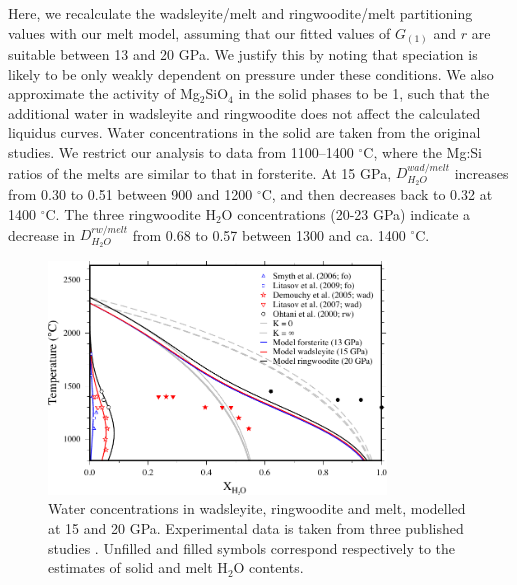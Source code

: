 \documentclass[review]{elsarticle}
\begin{document}
Here, we recalculate the wadsleyite/melt and ringwoodite/melt partitioning values with our melt model, assuming that our fitted values of $G_{(1)}$ and $r$ are suitable between 13 and 20 GPa. We justify this by noting that speciation is likely to be only weakly dependent on pressure under these conditions. We also approximate the activity of Mg$_2$SiO$_4$ in the solid phases to be 1, such that the additional water in wadsleyite and ringwoodite does not affect the calculated liquidus curves. Water concentrations in the solid are taken from the original studies. We restrict our analysis to data from 1100--1400 $^{\circ}$C, where the Mg:Si ratios of the melts are similar to that in forsterite. At 15 GPa, $D^{wad/melt}_{H_2O}$ increases from 0.30 to 0.51 between 900 and 1200 $^{\circ}$C, and then decreases back to 0.32 at 1400 $^{\circ}$C. The three ringwoodite H$_2$O concentrations (20-23 GPa) indicate a decrease in $D^{rw/melt}_{H_2O}$ from 0.68 to 0.57 between 1300 and ca. 1400 $^{\circ}$C.

\begin{figure}[ht!]
  \centering
      \includegraphics[width=0.8\textwidth]{figures/fo_wad_rw_edited}
  \caption{Water concentrations in wadsleyite, ringwoodite and melt, modelled at 15 and 20 GPa. Experimental data is taken from three published studies \citep{OMY2000,DDFK2005,LSOK2011}. Unfilled and filled symbols correspond respectively to the estimates of solid and melt H$_2$O contents.}
  \label{fig:fo_wad_rw_melt}
\end{figure}
\end{document}
